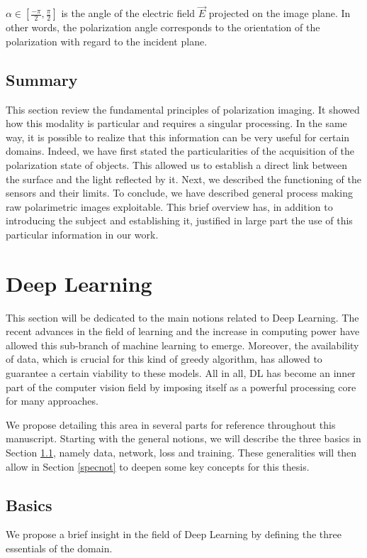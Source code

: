 $\alpha \in \left[\frac{-\pi}{2}, \frac{\pi}{2}\right]$ is the angle of the electric field $\vec{E}$ projected on the image plane. In other words, the polarization angle corresponds to the orientation of the polarization with regard to the incident plane.

\subsection{Summary}

This section review the fundamental principles of polarization imaging. It showed how this modality is particular and requires a singular processing. In the same way, it is possible to realize that this information can be very useful for certain domains. Indeed, we have first stated the particularities of the acquisition of the polarization state of objects. This allowed us to establish a direct link between the surface and the light reflected by it. Next, we described the functioning of the sensors and their limits. To conclude, we have described general process making raw polarimetric images exploitable. This brief overview has, in addition to introducing the subject and establishing it, justified in large part the use of this particular information in our work.





\section{Deep Learning}\label{DL_explain}

This section will be dedicated to the main notions related to Deep Learning. The recent advances in the field of learning and the increase in computing power have allowed this sub-branch of machine learning to emerge. Moreover, the availability of data, which is crucial for this kind of greedy algorithm, has allowed to guarantee a certain viability to these models. All in all, DL has become an inner part of the computer vision field by imposing itself as a powerful processing core for many approaches.

We propose detailing this area in several parts for reference throughout this manuscript. Starting with the general notions, we will describe the three basics in Section \ref{basics}, namely data, network, loss and training.
These generalities will then allow in Section \ref{specnot} to deepen some key concepts for this thesis.

\subsection{Basics}\label{basics}
We propose a brief insight in the field of Deep Learning by defining the three essentials of the domain.

